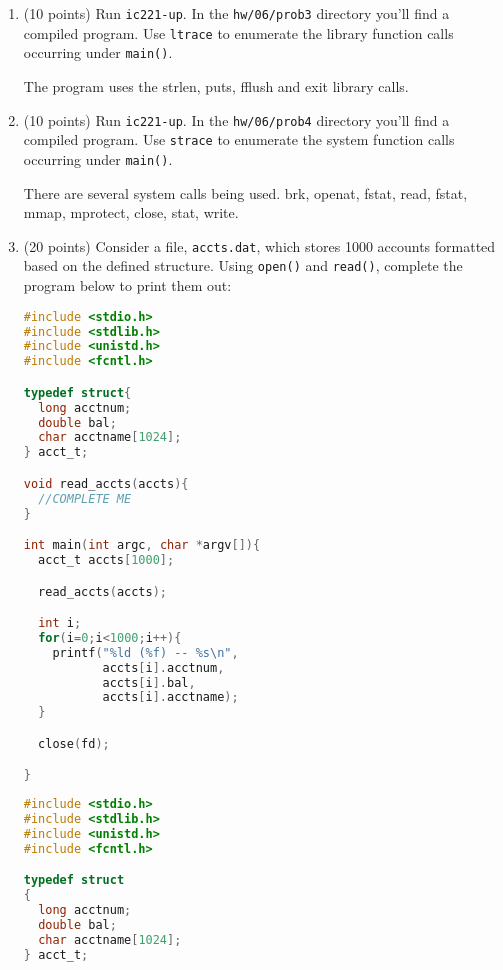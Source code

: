 \documentclass{article}[9pt]
\newenvironment{answerfont}{\fontfamily{qhv}\selectfont}{\par}
\newenvironment{myanswer}{\begin{mdframed}\begin{answerfont}}{\end{answerfont}\end{mdframed}}
\begin{document}
\begin{enumerate}
\begin{enumerate}
\end{enumerate}

\item (10 points) Run \texttt{ic221-up}. In the \texttt{hw/06/prob3} directory you'll find a compiled
program. Use \texttt{ltrace} to enumerate the library function calls
occurring under \texttt{main()}.

\begin{myanswer}
The program uses the strlen, puts, fflush and exit library calls.
\end{myanswer}

\item (10 points) Run \texttt{ic221-up}. In the \texttt{hw/06/prob4} directory you'll find a compiled
program. Use \texttt{strace} to enumerate the system function calls
occurring under \texttt{main()}.

\begin{myanswer}
There are several system calls being used. brk, openat, fstat, read, fstat, mmap, mprotect, close, stat, write.
\end{myanswer}

\item (20 points) Consider a file, \texttt{accts.dat}, which stores 1000 accounts
formatted based on the defined structure. Using \texttt{open()} and
\texttt{read()}, complete the program below to print them out:


\begin{lstlisting}[language=c]
#include <stdio.h>
#include <stdlib.h>
#include <unistd.h>
#include <fcntl.h>

typedef struct{
  long acctnum;
  double bal;
  char acctname[1024];
} acct_t;

void read_accts(accts){
  //COMPLETE ME
}

int main(int argc, char *argv[]){
  acct_t accts[1000];

  read_accts(accts);

  int i;
  for(i=0;i<1000;i++){
    printf("%ld (%f) -- %s\n",
           accts[i].acctnum,
           accts[i].bal,
           accts[i].acctname);
  }

  close(fd);

}
\end{lstlisting}

\begin{myanswer}
\begin{lstlisting}[language=c]
#include <stdio.h>
#include <stdlib.h>
#include <unistd.h>
#include <fcntl.h>

typedef struct
{
  long acctnum;
  double bal;
  char acctname[1024];
} acct_t;


\end{lstlisting}
\end{myanswer}
\end{enumerate}
\end{document}
